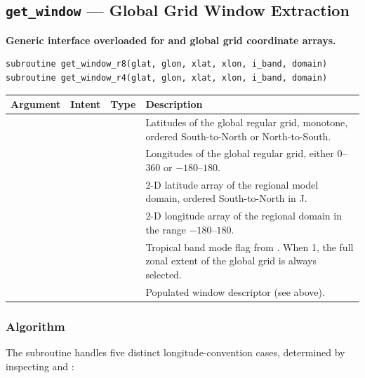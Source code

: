 \subsection{\texttt{get\_window} --- Global Grid Window Extraction}
\label{subsec:earth_getwindow}

\textbf{Generic interface overloaded for  and  global
grid coordinate arrays.}

\begin{lstlisting}
subroutine get_window_r8(glat, glon, xlat, xlon, i_band, domain)
subroutine get_window_r4(glat, glon, xlat, xlon, i_band, domain)
\end{lstlisting}

\begin{longtable}{L{3cm} L{2.5cm} L{3.5cm} L{5cm}}
  \toprule
  \textbf{Argument} & \textbf{Intent} & \textbf{Type} & \textbf{Description} \\
  \midrule
  \endhead
  \bottomrule
  \endfoot
   &  &  &
    Latitudes of the global regular grid, monotone, ordered South-to-North
    or North-to-South. \\
   &  &  &
    Longitudes of the global regular grid, either $0$--$360$ or
    $-180$--$180$. \\
   &  &  &
    2-D latitude array of the regional model domain, ordered
    South-to-North in J. \\
   &  &  &
    2-D longitude array of the regional domain in the range
    $-180$--$180$. \\
   &  &  &
    Tropical band mode flag from . When 1, the
    full zonal extent of the global grid is always selected. \\
   &  &  &
    Populated window descriptor (see above). \\
\end{longtable}

\subsubsection{Algorithm}

The subroutine handles five distinct longitude-convention cases, determined
by inspecting  and :

